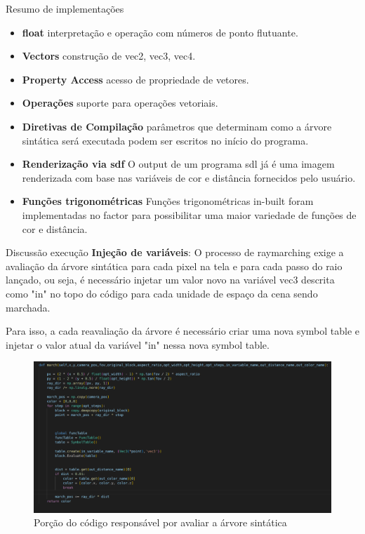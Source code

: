 \documentclass[2pt]{beamer} %
\begin{document}
\begin{frame}{Resumo de implementações}
\begin{itemize}
\item \textbf{float} interpretação e operação com números de ponto flutuante.
\item \textbf{Vectors} construção de vec2, vec3, vec4.
\item \textbf{Property Access} acesso de propriedade de vetores.
\item \textbf{Operações} suporte para operações vetoriais.
\item \textbf{Diretivas de Compilação} parâmetros que determinam como a árvore sintática será executada podem ser escritos no início do programa.
\item \textbf{Renderização via sdf} O output de um programa sdl já é uma imagem renderizada com base nas variáveis de cor e distância fornecidos pelo usuário.
\item \textbf{Funções trigonométricas} Funções trigonométricas in-built foram implementadas no factor para possibilitar uma maior variedade de funções de cor e distância.

\end{itemize}
\end{frame}

\begin{frame}{Discussão execução}
    \textbf{Injeção de variáveis}: O processo de raymarching exige a avaliação da árvore sintática para cada pixel na tela e para cada passo do raio lançado,
    ou seja, é necessário injetar um valor novo na variável vec3 descrita como "in" no topo do código para cada unidade de espaço da cena sendo marchada.

    Para isso, a cada reavaliação da árvore é necessário criar uma nova symbol table e injetar o valor atual da variável "in" nessa nova symbol table.

    \begin{figure}
        \centering
        \includegraphics[width=0.65\linewidth]{imgs/march_code.png}
        \caption{Porção do código responsável por avaliar a árvore sintática}
        \label{fig:enter-label}
    \end{figure}
        
\end{frame}



\end{document}
